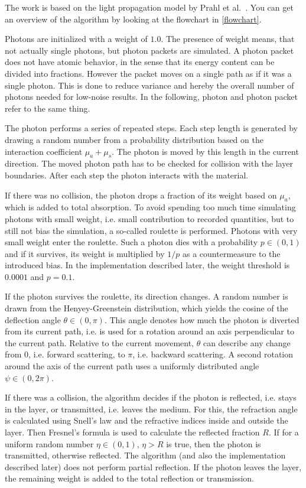 \documentclass[]{article}
\begin{document}
The work is based on the light propagation model by Prahl et al.~\cite{prahl89}. You can get an overview of the algorithm by looking at the flowchart in \autoref{flowchart}.

Photons are initialized with a weight of $1.0$. The presence of weight means, that not actually single photons, but photon packets are simulated. A photon packet does not have atomic behavior, in the sense that its energy content can be divided into fractions. However the packet moves on a single path as if it was a single photon. This is done to reduce variance and hereby the overall number of photons needed for low-noise results. In the following, photon and photon packet refer to the same thing.

The photon performs a series of repeated steps. Each step length is generated by drawing a random number from a probability distribution based on the interaction coefficient $\mu_a+\mu_s$. The photon is moved by this length in the current direction. The moved photon path has to be checked for collision with the layer boundaries. After each step the photon interacts with the material.

If there was no collision, the photon drops a fraction of its weight based on $\mu_a$, which is added to total absorption. To avoid spending too much time simulating photons with small weight, i.e. small contribution to recorded quantities, but to still not bias the simulation, a so-called roulette is performed. Photons with very small weight enter the roulette. Such a photon dies with a probability $p \in (0,1)$ and if it survives, its weight is multiplied by $1/p$ as a countermeasure to the introduced bias. In the implementation described later, the weight threshold is $0.0001$ and $p=0.1$.

If the photon survives the roulette, its direction changes. A random number is drawn from the Henyey-Greenstein distribution, which yields the cosine of the deflection angle $\theta \in (0, \pi)$. This angle denotes how much the photon is diverted from its current path, i.e. is used for a rotation around an axis perpendicular to the current path. Relative to the current movement, $\theta$ can describe any change from $0$, i.e. forward scattering, to $\pi$, i.e. backward scattering. A second rotation around the axis of the current path uses a uniformly distributed angle $\psi \in (0, 2\pi)$.

If there was a collision, the algorithm decides if the photon is reflected, i.e. stays in the layer, or transmitted, i.e. leaves the medium. For this, the refraction angle is calculated using Snell's law and the refractive indices inside and outside the layer. Then Fresnel's formula is used to calculate the reflected fraction $R$. If for a uniform random number $\eta \in (0,1)$, $\eta > R$ is true, then the photon is transmitted, otherwise reflected. The algorithm (and also the implementation described later) does not perform partial reflection. If the photon leaves the layer, the remaining weight is added to the total reflection or transmission.
\end{document}
